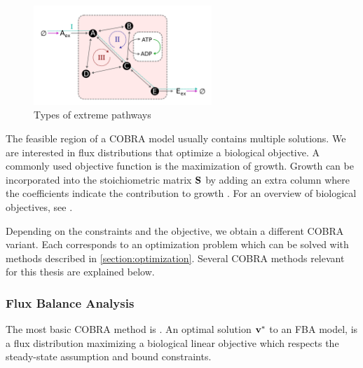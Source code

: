 \begin{figure}[h!]
    \centering
    \includegraphics[width=0.6\textwidth]{Images/extreme_pathways.png}
    \caption{Types of extreme pathways}
    \label{fig:extreme_pathways}
\end{figure}

The feasible region of a COBRA model usually contains multiple solutions. We are interested in flux distributions that optimize a biological objective. A commonly used objective function is the maximization of growth. Growth can be incorporated into the stoichiometric matrix $\bold S$ by adding an extra column where the coefficients indicate the contribution to growth \cite{FBA}. For an overview of biological objectives, see \cite{palsson_systems_biology}.

Depending on the constraints and the objective, we obtain a different COBRA variant. Each corresponds to an optimization problem which can be solved with methods described in \cref{section:optimization}. Several COBRA methods relevant for this thesis are explained below.

\subsubsection{Flux Balance Analysis} \label{section:fba}
The most basic COBRA method is . An optimal solution $\bold v^*$ to an \textsf{FBA} model, is a flux distribution maximizing a biological linear objective which respects the steady-state assumption and bound constraints.



